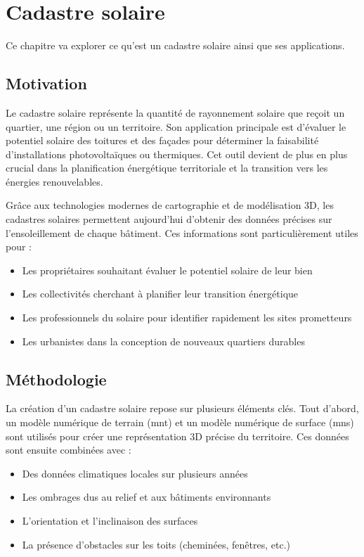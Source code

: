 \section{Cadastre solaire}
\par{Ce chapitre va explorer ce qu'est un cadastre solaire ainsi que ses applications.}

\subsection{Motivation}
\par{Le cadastre solaire \cite{noauthor_solar_2022} représente la quantité de rayonnement solaire que reçoit un quartier, une région ou un territoire. Son application principale est d'évaluer le potentiel solaire des toitures et des façades pour déterminer la faisabilité d'installations photovoltaïques ou thermiques. Cet outil devient de plus en plus crucial dans la planification énergétique territoriale et la transition vers les énergies renouvelables.}

\par{Grâce aux technologies modernes de cartographie et de modélisation 3D, les cadastres solaires permettent aujourd'hui d'obtenir des données précises sur l'ensoleillement de chaque bâtiment. Ces informations sont particulièrement utiles pour :
\begin{itemize}
    \item Les propriétaires souhaitant évaluer le potentiel solaire de leur bien
    \item Les collectivités cherchant à planifier leur transition énergétique
    \item Les professionnels du solaire pour identifier rapidement les sites prometteurs
    \item Les urbanistes dans la conception de nouveaux quartiers durables
\end{itemize}}

\subsection{Méthodologie}
\par{La création d'un cadastre solaire repose sur plusieurs éléments clés. Tout d'abord, un modèle numérique de terrain (\acrshort{mnt}) et un modèle numérique de surface (\acrshort{mns}) sont utilisés pour créer une représentation 3D précise du territoire. Ces données sont ensuite combinées avec :
\begin{itemize}
    \item Des données climatiques locales sur plusieurs années
    \item Les ombrages dus au relief et aux bâtiments environnants
    \item L'orientation et l'inclinaison des surfaces
    \item La présence d'obstacles sur les toits (cheminées, fenêtres, etc.)
\end{itemize}}

